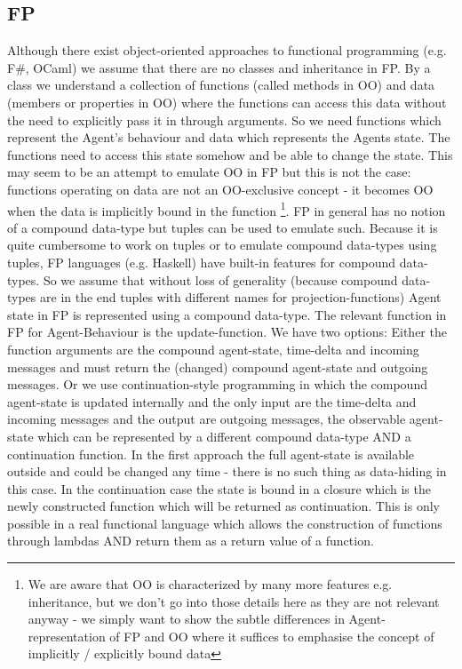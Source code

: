 \subsection{FP}
Although there exist object-oriented approaches to functional programming (e.g. F\#, OCaml) we assume that there are no classes and inheritance in FP. By a class we understand a collection of functions (called methods in OO) and data (members or properties in OO) where the functions can access this data without the need to explicitly pass it in through arguments.
So we need functions which represent the Agent's behaviour and data which represents the Agents state. The functions need to access this state somehow and be able to change the state. This may seem to be an attempt to emulate OO in FP but this is not the case: functions operating on data are not an OO-exclusive concept - it becomes OO when the data is implicitly bound in the function \footnote{We are aware that OO is characterized by many more features e.g. inheritance, but we don't go into those details here as they are not relevant anyway - we simply want to show the subtle differences in Agent-representation of FP and OO where it suffices to emphasise the concept of implicitly / explicitly bound data}.
FP in general has no notion of a compound data-type but tuples can be used to emulate such. Because it is quite cumbersome to work on tuples or to emulate compound data-types using tuples, FP languages (e.g. Haskell) have built-in features for compound data-types. So we assume that without loss of generality (because compound data-types are in the end tuples with different names for projection-functions) Agent state in FP is represented using a compound data-type.
The relevant function in FP for Agent-Behaviour is the update-function. We have two options:
Either the function arguments are the compound agent-state, time-delta and incoming messages and must return the (changed) compound agent-state and outgoing messages.
Or we use continuation-style programming in which the compound agent-state is updated internally and the only input are the time-delta and incoming messages and the output are outgoing messages, the observable agent-state which can be represented by a different compound data-type AND a continuation function.
In the first approach the full agent-state is available outside and could be changed any time - there is no such thing as data-hiding in this case. In the continuation case the state is bound in a closure which is the newly constructed function which will be returned as continuation. This is only possible in a real functional language which allows the construction of functions through lambdas AND return them as a return value of a function.

